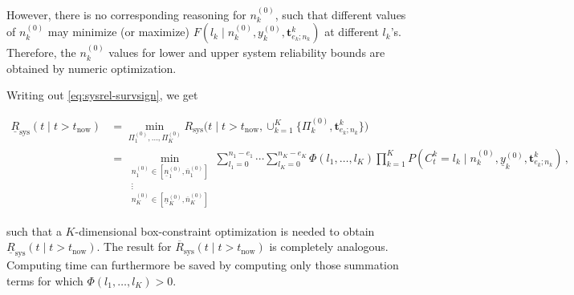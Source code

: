 \documentclass[Journal,SectionNumbers,SingleSpace,InsideFigs]{ascelike}
\newcommand{\mbf}[1]{\mathbf{#1}}
\renewcommand{\vec}[1]{{\bm#1}}
\newcommand{\uz}{^{(0)}} %
\newcommand{\ul}[1]{\underline{#1}}
\newcommand{\ol}[1]{\overline{#1}}
\newcommand{\Rsys}{R_\text{sys}}
\newcommand{\lRsys}{\ul{R}_\text{sys}}
\newcommand{\uRsys}{\ol{R}_\text{sys}}
\def\Rsys{R_\text{sys}}
\def\Tsys{T_\text{sys}}
\def\ykz{y\uz_k}
\def\ykzl{\ul{y}\uz_k}
\def\nkz{n\uz_k}
\newcommand{\nkzfun}[1]{n\uz_{#1}}
\newcommand{\nkzlfun}[1]{\ul{n}\uz_{#1}}
\newcommand{\nkzufun}[1]{\ol{n}\uz_{#1}}
\def\PkZ{\Pi\uz_k}
\newcommand{\PZi}[1]{\Pi\uz_{#1}}
\def\tnow{t_\text{now}}
\begin{document}
However, there is no corresponding reasoning for $\nkz$,
such that different values of $\nkz$ may minimize (or maximize) $F(l_k \mid \nkz,\ykz,\vec{t}^k_{e_k;n_k})$ at different $l_k$'s.
Therefore, the $\nkz$ values for lower and upper system reliability bounds are obtained by numeric optimization.
%
\iffalse %
\begin{linenomath*}
\begin{align} \label{eq:25}
\lefteqn{%
P(\Tsys > t\mid\{\nkz,\ykz, \mbf{t}^k_{e_k;n_k}\}_{k=1}^K)} \hspace*{10ex}\nonumber\\ 
 &= \sum_{l_1=0}^{n_1-e_1} \cdots \sum_{l_K=0}^{n_K-e_K} \Phi(l_1,\ldots,l_K) \prod_{k=1}^K
    P(C^k_t = l_k\mid\nkz,\ykz, \vec{t}^k_{e_k;n_k})
\end{align}
\end{linenomath*}
we cannot simply plug in all the $\ul{P}(C^k_t = l_k\mid \ldots)$ %
to get $\ul{P}(\Tsys > t\mid\nkz,\ykz, \mbf{t}^k_{e_k;n_k})$, %
as the $\ul{P}(C^k_t = l_k\mid \ldots)$ could correspond to different $(\nkz,\ykz)$ for each $l_k$.
(It would give us a lower bound for $\ul{P}(\Tsys > t\mid\ldots)$, however, but it might be very coarse.)
%
While it is clear that the lower bounds for $\ykz$ will lead to the lower system survival function,
the role of $\nkz$ is not so clear.
We therefore resort to numerical optimization of \eqref{eq:25} over $\{\nkz, k=1,\ldots,K\}$
to obtain the lower bound for $P(\Tsys > t\mid\{\nkz,\ykz, \mbf{t}^k_{e_k;n_k}\}_{k=1}^K)$.
\fi %

Writing out \eqref{eq:sysrel-survsign}, we get
\begin{linenomath*}
\begin{align}
\lRsys(t \mid t > \tnow)
 &= \min_{\PZi{1},\ldots,\PZi{K}} \Rsys\big(t \mid t > \tnow, \cup_{k=1}^K \{\PkZ, \vec{t}^k_{e_k;n_k}\}\big) \nonumber\\
 &= \min_{\substack{\nkzfun{1} \in \left[\nkzlfun{1}, \nkzufun{1}\right]\\ \vdots\\ \nkzfun{K} \in \left[\nkzlfun{K}, \nkzufun{K}\right]}}
    \sum_{l_1=0}^{n_1-e_1} \cdots \sum_{l_K=0}^{n_K-e_K} \Phi(l_1,\ldots,l_K) \prod_{k=1}^K P(C^k_t = l_k\mid\nkz,\ykzl, \mbf{t}^k_{e_k;n_k})\,,
\end{align}
\end{linenomath*}
such that a $K$-dimensional box-constraint optimization is needed to obtain $\lRsys(t \mid t > \tnow)$.
The result for $\uRsys(t \mid t > \tnow)$ is completely analogous.
Computing time can furthermore be saved
by computing only those %
summation terms for which $\Phi(l_1,\ldots,l_K) > 0$.
\end{document}
